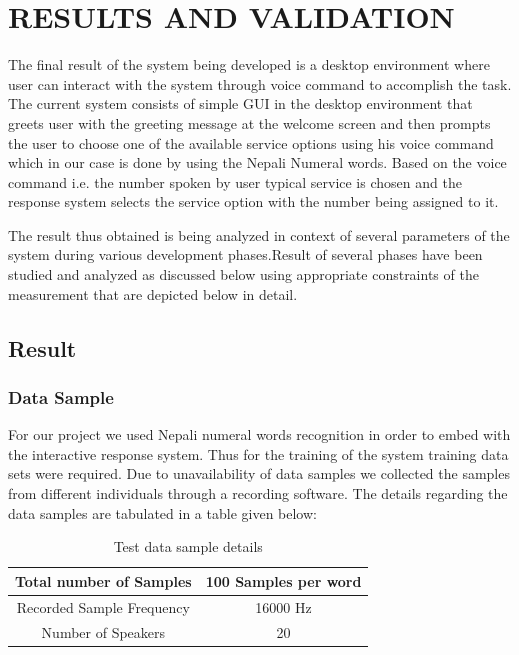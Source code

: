 

\section{RESULTS AND VALIDATION}
The final result of the system being developed is a desktop environment where user can interact with the system through voice command to accomplish the task. The current system consists of simple GUI in the desktop environment that greets user with the greeting message at the welcome screen and then prompts the user to choose one of the available service options using his voice command which in our case is done by using the Nepali Numeral words. Based on the voice command i.e. the number spoken by user typical service is chosen and the response system selects the service option with the number being assigned to it.

The result thus obtained is being analyzed in context of several parameters of the system during various development phases.Result of several phases have been studied and analyzed as discussed below using appropriate constraints of the measurement that are depicted below
in detail.

\subsection{Result}

\subsubsection{Data Sample}
For our project we used Nepali numeral words recognition in order to embed with the interactive response system. Thus for the training of the system training data sets were required. Due to unavailability of data samples we collected the samples from different individuals through a recording software. The details regarding the data samples are tabulated in a table given below:


\begin{center}
	\begin {table}[h]
	\begin{center}
		
	\begin{tabular}{ |c|c| } 
		\hline
		Total number of Samples & 100 Samples per word  \\ 
		\hline
		Recorded Sample Frequency & 16000 Hz  \\ 
		\hline
		Number of Speakers & 20  \\ 
		\hline
	\end{tabular}
\caption{Test data sample details}
\end{center}
\end{table}
\end{center}


